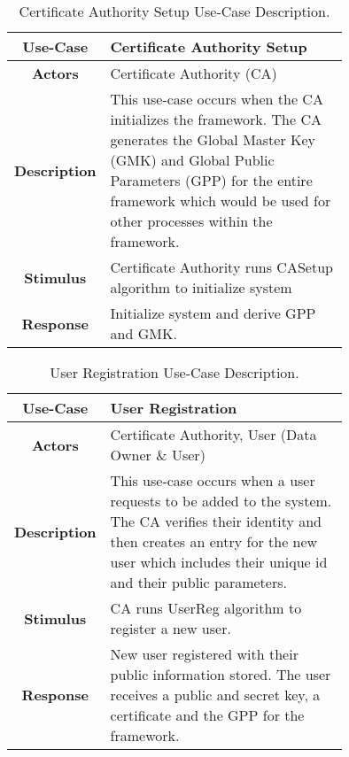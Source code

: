 \begin{table}[]
	\centering
	\begin{tabular}{|c|p{0.75\linewidth}|}
		\hline
		\textbf{Use-Case}    & Certificate Authority Setup                                  \\ \hline
		\textbf{Actors}      & Certificate Authority (CA)                        \\ \hline
		\textbf{Description} & This use-case occurs when the CA initializes the framework. The CA generates the Global Master Key (GMK) and Global Public Parameters (GPP) for the entire framework which would be used for other processes within the framework. \\ \hline
		\textbf{Stimulus}    & Certificate Authority runs CASetup algorithm to initialize system                     \\ \hline
		\textbf{Response}    & Initialize system and derive GPP and GMK.             \\ \hline
	\end{tabular}
	\caption{Certificate Authority Setup Use-Case Description.}
	\label{tab:use_case_casetup}
\end{table}

\begin{table}[]
	\centering
	\begin{tabular}{|c|p{0.75\linewidth}|}
		\hline
		\textbf{Use-Case}    & User Registration                                   \\ \hline
		\textbf{Actors}      & Certificate Authority, User (Data Owner \& User)                        \\ \hline
		\textbf{Description} & This use-case occurs when a user requests to be added to the system. The CA verifies their identity and then creates an entry for the new user which includes their unique id and their public parameters.  \\ \hline
		\textbf{Stimulus}    & CA runs UserReg algorithm to register a new user.                    \\ \hline
		\textbf{Response}    & New user registered with their public information stored. The user receives a public and secret key, a certificate and the GPP for the framework.             \\ \hline
	\end{tabular}
	\caption{User Registration Use-Case Description.}
	\label{tab:use_case_userreg}
\end{table}

